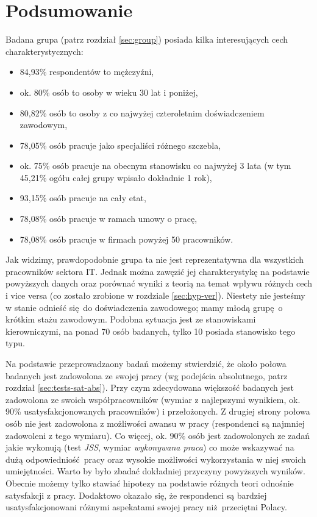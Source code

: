 \chapter{Podsumowanie}

Badana grupa (patrz rozdział \ref{sec:group}) posiada kilka interesujących cech charakterystycznych:
\begin{itemize}
  \item 84,93\% respondentów to mężczyźni,
  \item ok. 80\% osób to osoby w wieku 30 lat i poniżej,
  \item 80,82\% osób to osoby z co najwyżej czteroletnim doświadczeniem zawodowym,
  \item 78,05\% osób pracuje jako specjaliści różnego szczebla,
  \item ok. 75\% osób pracuje na obecnym stanowisku co najwyżej 3 lata (w tym 45,21\% ogółu całej grupy wpisało dokładnie 1 rok),
  \item 93,15\% osób pracuje na cały etat,
  \item 78,08\% osób pracuje w ramach umowy o pracę,
  \item 78,08\% osób pracuje w firmach powyżej 50 pracowników.
\end{itemize}
Jak widzimy, prawdopodobnie grupa ta nie jest reprezentatywna dla wszystkich pracowników sektora IT. Jednak można zawęzić jej charakterystykę na podstawie powyższych danych oraz porównać wyniki z teorią na temat wpływu różnych cech i vice versa (co zostało zrobione w rozdziale \ref{sec:hyp-ver}). Niestety nie jesteśmy w stanie odnieść się do doświadczenia zawodowego; mamy młodą grupę o krótkim stażu zawodowym. Podobna sytuacja jest ze stanowiskami kierowniczymi, na ponad 70 osób badanych, tylko 10 posiada stanowisko tego typu.

Na podstawie przeprowadzaony badań możemy stwierdzić, że około połowa badanych jest zadowolona ze swojej pracy (wg podejścia absolutnego, patrz rozdział \ref{sec:tests-sat-abs}). Przy czym zdecydowana większość badanych jest zadowolona ze swoich współpracowników (wymiar z najlepszymi wynikiem, ok. 90\% usatysfakcjonowanych pracowników) i przełożonych. Z drugiej strony połowa osób nie jest zadowolona z możliwości awansu w pracy (respondenci są
najmniej zadowoleni z tego wymiaru). Co więcej, ok. 90\% osób jest zadowolonych ze zadań jakie wykonują (test \emph{JSS}, wymiar \textit{wykonywana praca}) co może wskazywać na dużą odpowiedniość pracy oraz wysokie możliwości wykorzystania w niej swoich umiejętności. Warto by było zbadać dokładniej przyczyny powyższych wyników. Obecnie możemy tylko stawiać hipotezy na podstawie różnych teori odnośnie satysfakcji z pracy.  Dodaktowo okazało się, że respondenci są bardziej usatysfakcjonowani różnymi aspekatami swojej pracy niż przeciętni Polacy.

